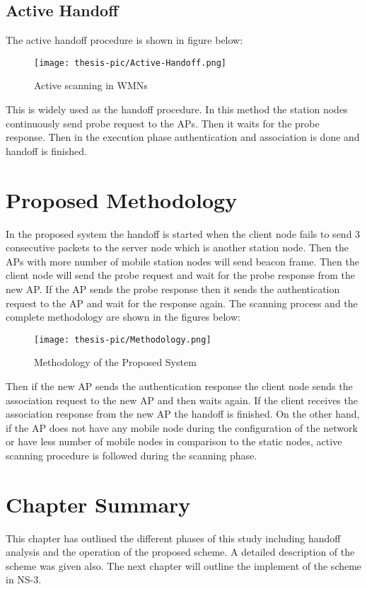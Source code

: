 \documentclass[12pt,a4paper]{report}
\begin{document}
\subsection{Active Handoff}
The active handoff procedure is shown in figure below:
\begin{figure}[H]
\texttt{[image: thesis-pic/Active-Handoff.png]}
\caption{Active scanning in WMNs}
\end{figure}
This is widely used as the handoff procedure. In this method the station nodes continuously send probe request to the APs. Then it waits for the probe response. Then in the execution phase authentication and association is done and handoff is finished.


\section{Proposed Methodology}
In the proposed system the handoff is started when the client node fails to send 3 consecutive packets to the server node which is another station node. Then the APs with more number of mobile station nodes will send beacon frame. Then the client node will send the probe request and wait for the probe response from the new AP. If the AP sends the probe response then it sends the authentication request to the AP and wait for the response again. 
The scanning process and the complete methodology are shown in the figures below: 
\begin{center}
\begin{figure}[H]
\texttt{[image: thesis-pic/Methodology.png]}
\caption{Methodology of the Proposed System}
\end{figure}
\end{center}
Then if the new AP sends the authentication response the client node sends the association request to the new AP and then waits again. If the client receives the association response from the new AP the handoff is finished. On the other hand, if the AP does not have any mobile node during the configuration of the network or have less number of mobile nodes in comparison to the static nodes, active scanning procedure is followed during the scanning phase.
\section{Chapter Summary}
This chapter has outlined the different phases of this study including handoff analysis and the operation of the proposed scheme. A detailed description of the scheme was given also. The next chapter will outline the implement of the scheme in NS-3.
\end{document}
